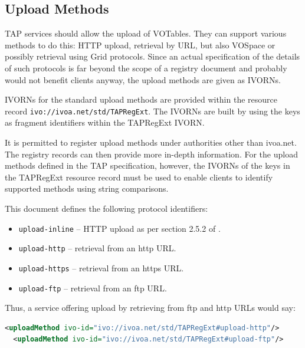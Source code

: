 \documentclass{ivoa}
\begin{document}

\subsection{Upload Methods}

\label{uploadmethods}

TAP services should allow the upload of VOTables.  They can support
various methods to do this: HTTP upload, retrieval by URL, but also VOSpace
or possibly retrieval using Grid protocols.  Since an actual specification
of the details of such protocols is far beyond the scope of a registry
document and probably would not benefit clients anyway, the upload
methods are given as IVORNs.

IVORNs for the standard upload methods are provided within the
resource record
\texttt{ivo://ivoa.net/std/TAPRegExt}.  
The IVORNs are built by using the keys as fragment identifiers within the 
TAPRegExt IVORN.

It is permitted to register upload methods under authorities other than
ivoa.net.
The registry records can then provide more in-depth information. For
the upload methods defined in the TAP specification, however, 
the IVORNs of the keys in the TAPRegExt resource record must be used to enable
clients to identify supported methods using string comparisons.

This document defines the following protocol identifiers:


\begin{itemize}

\item \texttt{upload-inline} -- HTTP upload as per section 2.5.2 of 
\citep{std:TAP}.{}

\item \texttt{upload-http} -- retrieval from an http URL.{}

\item \texttt{upload-https} -- retrieval from an https URL.{}

\item \texttt{upload-ftp} -- retrieval from an ftp URL.{}

\end{itemize}

Thus, a service offering upload by retrieving from ftp and http URLs
would say:


\begin{lstlisting}[language=XML]
  <uploadMethod ivo-id="ivo://ivoa.net/std/TAPRegExt#upload-http"/>
  <uploadMethod ivo-id="ivo://ivoa.net/std/TAPRegExt#upload-ftp"/>
\end{lstlisting}
\end{document}
